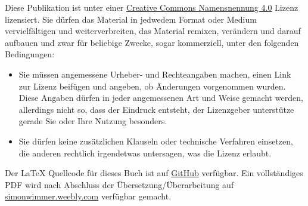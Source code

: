 \bigskip

\noindent \footnotesize Diese Publikation ist unter einer \href{https://creativecommons.org/licenses/by/4.0/}{Creative Commons Namensnennung 4.0} Lizenz lizensiert. 
Sie dürfen das Material in jedwedem Format oder Medium vervielfältigen und weiterverbreiten, das Material remixen, verändern und darauf aufbauen und zwar für beliebige Zwecke, sogar kommerziell, unter den folgenden Bedingungen:
\begin{itemize}
\item Sie müssen angemessene Urheber- und Rechteangaben machen, einen Link zur Lizenz beifügen und angeben, ob Änderungen vorgenommen wurden. Diese Angaben dürfen in jeder angemessenen Art und Weise gemacht werden, allerdings nicht so, dass der Eindruck entsteht, der Lizenzgeber unterstütze gerade Sie oder Ihre Nutzung besonders. 
\item Sie dürfen keine zusätzlichen Klauseln oder technische Verfahren einsetzen, die anderen rechtlich irgendetwas untersagen, was die Lizenz erlaubt. 
\end{itemize}

\vfil\normalsize\noindent
Der \LaTeX{} Quellcode für dieses Buch ist auf \href{https://github.com/sbwimmer/forallx-do}{GitHub} verfügbar. Ein vollständiges PDF wird nach Abschluss der Übersetzung/Überarbeitung auf \href{https://simonwimmer.weebly.com}{simonwimmer.weebly.com} verfügbar gemacht.

\bigskip

